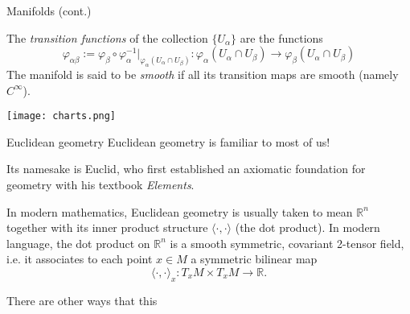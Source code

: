 \documentclass[handout]{beamer}
\newcommand{\RR}{\mathbb{R}}
\renewcommand{\phi}{\varphi}
\begin{document}
\begin{frame}{Manifolds (cont.)}

    \begin{definition}
    The \emph{transition functions} of the collection $\{U_\alpha\}$ are the functions 
    \[
      \phi_{\alpha \beta} := \phi_\beta \circ \phi^{-1} _\alpha |_{\phi_{\alpha}(U_\alpha \cap U_\beta)} : \phi_\alpha(U_\alpha \cap U_\beta) \to \phi_\beta(U_\alpha \cap U_\beta)
    \]
    The manifold is said to be \emph{smooth} if all its transition maps are smooth (namely $C^\infty$).
  \end{definition}
  \begin{center}
    \texttt{[image: charts.png]}
  \end{center}
\end{frame}


\begin{frame}{Euclidean geometry}
  Euclidean geometry is familiar to most of us! 

  Its namesake is Euclid, who first established an axiomatic foundation for geometry with his textbook \emph{Elements}.

  In modern mathematics, Euclidean geometry is usually taken to mean $\RR^n$ together with its inner product structure $\langle \cdot , \cdot \rangle$ (the dot product).
  In modern language, the dot product on $\RR^n$ is a smooth symmetric, covariant 2-tensor field, i.e. it associates to each point $x\in M$ a symmetric bilinear map 
  \[
    \langle \cdot , \cdot \rangle_x : T_xM \times T_xM \to \RR.
  \]

  There are other ways that this 
\end{frame}
\end{document}
